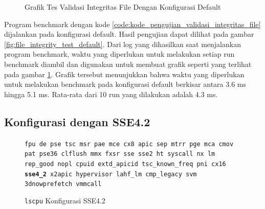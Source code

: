 \begin{figure}
    \centering
    \caption{Grafik Tes Validasi Integritas File Dengan Konfigurasi Default}
    \label{fig:file_integrity_test_default_graph}
\end{figure}

Program benchmark dengan kode \ref{code:kode_pengujian_validasi_integritas_file} dijalankan pada konfigurasi default. Hasil pengujian dapat dilihat pada gambar \ref{fig:file_integrity_test_default}. Dari log yang dihasilkan saat menjalankan program benchmark, waktu yang diperlukan untuk melakukan setiap run benchmark diambil dan digunakan untuk membuat grafik seperti yang terlihat pada gambar \ref{fig:file_integrity_test_default_graph}. Grafik tersebut menunjukkan bahwa waktu yang diperlukan untuk melakukan benchmark pada konfigurasi default berkisar antara 3.6 ms hingga 5.1 ms. Rata-rata dari 10 run yang dilakukan adalah 4.3 ms.

\subsection{Konfigurasi dengan SSE4.2}
\begin{figure}
    \texttt{fpu de pse tsc msr pae mce cx8 apic sep mtrr pge mca cmov pat pse36 clflush mmx fxsr sse sse2 ht syscall nx lm rep\_good nopl cpuid extd\_apicid tsc\_known\_freq pni cx16 \textbf{sse4\_2} x2apic hypervisor lahf\_lm cmp\_legacy svm 3dnowprefetch vmmcall}
    \caption{\texttt{lscpu} Konfigurasi SSE4.2}
    \label{fig:lscpu_file_integrity_test_sse4.2}
\end{figure}

